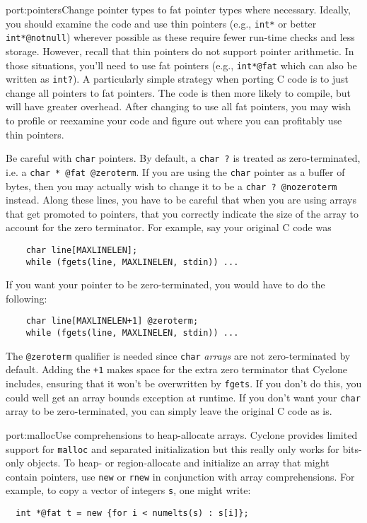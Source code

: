 \begin{porta}{port:pointers}{Change pointer types to fat pointer types where necessary.}  
Ideally, you should examine the code and use thin pointers (e.g., \texttt{int*}
or better \texttt{int*@notnull}) wherever possible as these require fewer
run-time checks and less storage.  However, recall that thin pointers
do not support pointer arithmetic.  In those situations, you'll need
to use fat pointers (e.g., \texttt{int*@fat} which can also be written
as \texttt{int?}).  A particularly simple strategy 
when porting C code is to just change all pointers to fat pointers.
The code is then more likely to compile, but will have greater overhead.
After changing to use all fat pointers, you may wish to profile or reexamine
your code and figure out where you can profitably use thin pointers.

Be careful with \texttt{char} pointers.  By default, a \texttt{char ?}
is treated as zero-terminated, i.e. a \texttt{char * @fat @zeroterm}.
If you are using the \texttt{char} pointer as a buffer of bytes, then
you may actually wish to change it to be a \texttt{char ? @nozeroterm}
instead.  Along these lines, you have to be careful that when you are
using arrays that get promoted to pointers, that you correctly
indicate the size of the array to account for the zero terminator.
For example, say your original C code was
\begin{verbatim}
    char line[MAXLINELEN];
    while (fgets(line, MAXLINELEN, stdin)) ...
\end{verbatim}
If you want your pointer to be zero-terminated, you would have to do
the following:
\begin{verbatim}
    char line[MAXLINELEN+1] @zeroterm;
    while (fgets(line, MAXLINELEN, stdin)) ...
\end{verbatim}
The \texttt{@zeroterm} qualifier is needed since \texttt{char}
\emph{arrays} are not zero-terminated by default.  Adding the
\texttt{+1} makes space for the extra zero terminator that Cyclone
includes, ensuring that it won't be overwritten by \texttt{fgets}.  If
you don't do this, you could well get an array bounds exception at
runtime.  If you don't want your \texttt{char} array to be
zero-terminated, you can simply leave the original C code as is.
\end{porta}

\begin{porta}{port:malloc}{Use comprehensions to heap-allocate arrays.}
Cyclone provides limited support for \texttt{malloc} and separated
initialization but this really only works for bits-only objects.
To heap- or region-allocate and initialize an array that might contain
pointers, use
\texttt{new} or \texttt{rnew} in conjunction with array comprehensions.  
For example, to copy a vector of integers \texttt{s}, one might write:
\begin{verbatim}
  int *@fat t = new {for i < numelts(s) : s[i]};
\end{verbatim}
\end{porta}

